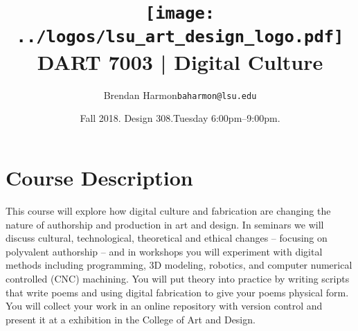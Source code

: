 \documentclass[11pt,article,oneside]{memoir}
\makeatletter
\def\myauthor{Author}
\def\mytitle{Title}
\def\myemail{baharmon@lsu.edu}
\def\myauthor{Brendan Harmon}
\def\mytitle{ \texttt{[image: ../logos/lsu\_art\_design\_logo.pdf]} \\[0.1cm] {\normalfont \normalsize DART 7003 |} \Large Digital Culture}
\newcommand{\globalcolor}[1]{%
  \color{#1}\global\let\default@color\current@color
}
\makeatother
\begin{document}
\setlength\bibitemsep{0.75em}

\setmainfont[Scale=1, Path = ../fonts/lato/,BoldItalicFont=Lato-RegIta,BoldFont=Lato-Reg,ItalicFont=Lato-LigIta]{Lato-Lig}
\setsansfont[Scale=1, Path = ../fonts/lato/,BoldItalicFont=Lato-RegIta,BoldFont=Lato-Reg,ItalicFont=Lato-LigIta]{Lato-Lig}
\setmonofont[Mapping=tex-text,Scale=0.8,Path = ../fonts/inconsolata/]{i}

\def\ind{\hangindent=1 true cm\hangafter=1 \noindent}
\def\labelitemi{$\cdot$}

\title{\LARGE \mytitle}
\author{\Large\myauthor \newline \footnotesize\texttt{\noindent\myemail}}
\date{Fall 2018. Design 308.\newline Tuesday 6:00pm--9:00pm.}
\published{\,}


\globalcolor{black}
\vspace*{-10em}
\maketitle
{} 
\clearpage


\globalcolor{black}

\vspace*{-10em}
\maketitle

\section{Course Description}
%
This course will explore 
how digital culture and fabrication
are changing the nature of authorship
and production in art and design.
%
In seminars we will discuss
cultural, technological, theoretical and ethical changes
-- focusing on polyvalent authorship -- 
and in workshops you will experiment 
with digital methods
including programming, 3D modeling, robotics,
and computer numerical controlled (CNC) machining.
%
You will put theory into practice
by writing scripts that write poems 
and using digital fabrication
to give your poems physical form.
You will collect your work 
in an online repository with version control
and present it at a exhibition
in the College of Art and Design.\\
\end{document}

